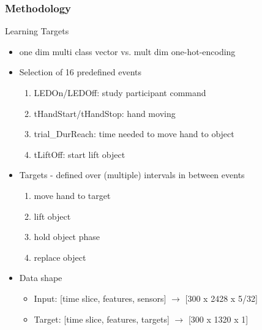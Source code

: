 \documentclass{beamer}
\begin{document}
\begin{frame}
\frametitle{Methodology}
Learning Targets
\begin{itemize}
  	\item one dim multi class vector vs. mult dim one-hot-encoding

    \item Selection of 16 predefined events
    \begin{enumerate}
        \item LEDOn/LEDOff: study participant command
        \item tHandStart/tHandStop: hand moving
        \item trial\_DurReach: time needed to move hand to object
        \item tLiftOff: start lift object
    \end{enumerate}
 
    \item Targets - defined over (multiple) intervals in between events
    \begin{enumerate}
    \item move hand to target
        \item lift object
        \item hold object phase
        \item replace object
    \end{enumerate}

    \item Data shape
    \begin{itemize}
        \item Input: [time slice, features, sensors] $\rightarrow$ [300 x 2428 x 5/32]
        \item Target: [time slice, features, targets] $\rightarrow$ [300 x 1320 x 1]
    \end{itemize}
\end{itemize}


\end{frame}
\end{document}

